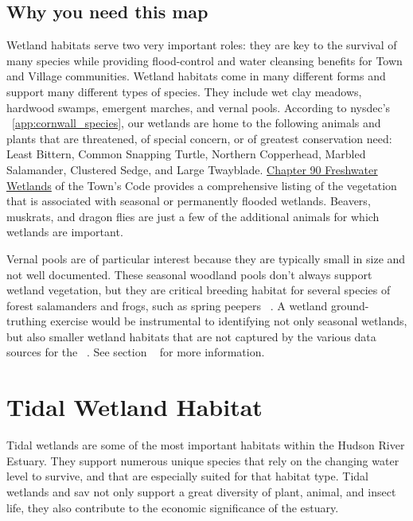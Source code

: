 \subsection*{Why you need this map}
Wetland habitats serve two very important roles: they are key to the survival
of many species while providing flood-control and water cleansing benefits for
Town and Village communities. Wetland habitats come in many different forms and
support many different types of species. They include wet clay meadows,
hardwood swamps, emergent marches, and vernal pools. According to
\gls{nysdec}'s 
~\ref{app:cornwall_species}, our wetlands are home to the following
animals and plants that are threatened, of special concern, or of greatest
conservation need: Least Bittern, Common Snapping Turtle, Northern Copperhead,
Marbled Salamander, Clustered Sedge, and Large Twayblade.
\href{https://ecode360.com/10555547?highlight=wetlands#10555547}{Chapter 90
Freshwater Wetlands} of the Town’s Code provides a comprehensive listing of the
vegetation that is associated with seasonal or permanently flooded wetlands.
Beavers, muskrats, and dragon flies are just a few of the additional animals
for which wetlands are important.
\par
Vernal pools are of particular interest because they are typically small in
size and not well documented. These seasonal woodland pools don't always
support wetland vegetation, but they are critical breeding habitat for several
species of forest salamanders and frogs, such as spring peepers
~\citep{haeckel2014}. A wetland ground-truthing exercise would be instrumental
to identifying not only seasonal wetlands, but also smaller wetland habitats
that are not captured by the various data sources for the 
~. See section ~
for more information.

\label{map:tidalwetlandsandSAV}
\section{Tidal Wetland Habitat}\label{subsec:tidalandwetlandhabitat}
Tidal wetlands are some of the most important habitats within the Hudson River
Estuary. They support numerous unique species that rely on the changing water
level to survive, and that are especially suited for that habitat type. Tidal
wetlands and \gls{sav} not only support a great diversity of plant, animal, and
insect life, they also contribute to the economic significance of the estuary.

